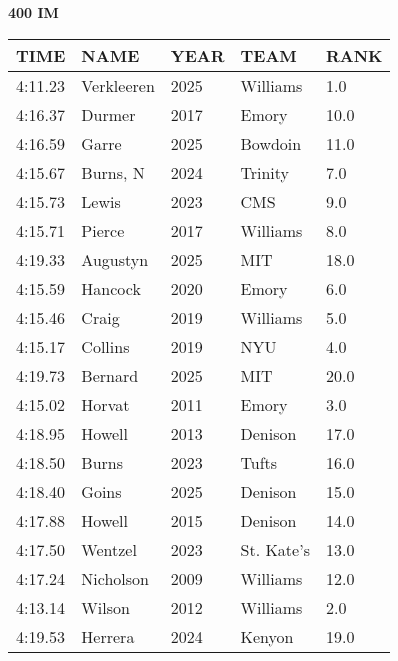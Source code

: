 \begin{center}
\begin{minipage}[t]{0.7\textwidth}
\centering
\textbf{400 IM}\\[0.05cm]
\begin{tabular}{@{}p{1.8cm}p{2.8cm}p{1.2cm}p{1.4cm}p{0.8cm}@{}}
\hline
\textbf{TIME} & \textbf{NAME} & \textbf{YEAR} & \textbf{TEAM} & \textbf{RANK} \\
\hline
4:11.23 & Verkleeren & 2025 & Williams & 1.0 \\
4:16.37 & Durmer & 2017 & Emory & 10.0 \\
4:16.59 & Garre & 2025 & Bowdoin & 11.0 \\
4:15.67 & Burns, N & 2024 & Trinity & 7.0 \\
4:15.73 & Lewis & 2023 & CMS & 9.0 \\
4:15.71 & Pierce & 2017 & Williams & 8.0 \\
4:19.33 & Augustyn & 2025 & MIT & 18.0 \\
4:15.59 & Hancock & 2020 & Emory & 6.0 \\
4:15.46 & Craig & 2019 & Williams & 5.0 \\
4:15.17 & Collins & 2019 & NYU & 4.0 \\
4:19.73 & Bernard & 2025 & MIT & 20.0 \\
4:15.02 & Horvat & 2011 & Emory & 3.0 \\
4:18.95 & Howell & 2013 & Denison & 17.0 \\
4:18.50 & Burns & 2023 & Tufts & 16.0 \\
4:18.40 & Goins & 2025 & Denison & 15.0 \\
4:17.88 & Howell & 2015 & Denison & 14.0 \\
4:17.50 & Wentzel & 2023 & St. Kate's & 13.0 \\
4:17.24 & Nicholson & 2009 & Williams & 12.0 \\
4:13.14 & Wilson & 2012 & Williams & 2.0 \\
4:19.53 & Herrera & 2024 & Kenyon & 19.0 \\
\hline
\end{tabular}
\end{minipage}
\end{center}

\vspace{0.4cm}

